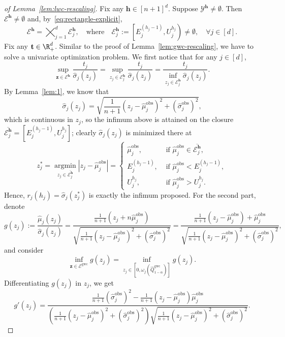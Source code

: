 \begin{proof}[of Lemma~\ref{lem:lwc-rescaling}]
Fix any $\mathbf{h} \in [n+1]^d$.
Suppose $\mathcal{Y}^{\mathbf{h}} \neq \emptyset$. Then $\mathcal{E}^{\mathbf{h}} \neq \emptyset$ and,
by~\eqref{eq:rectangle-explicit},
\[
\mathcal{E}^{\mathbf{h}} = \bigtimes_{j=1}^{d} \mathcal{E}^{\mathbf{h}}_j,
\quad\text{where}\quad
\mathcal{E}^{\mathbf{h}}_j :=\left[E^{(h_j-1)}_j, U^{h_j}_j\right) \neq \emptyset, \quad \forall j \in [d].
\]
Fix any $\mathbf t \in \R^d_+$. Similar to the proof of Lemma~\ref{lem:gwc-rescaling}, we have to solve a univariate optimization problem. We first notice that for any $j \in [d]$,
\[
\sup_{\mathbf z \in \mathcal{E}^{\mathbf{h}}} \frac{t_j}{\hat{\sigma}_{j}(z_j)}= \sup_{z_j \in \mathcal{E}^{\mathbf{h}}_j} \frac{t_j}{\hat{\sigma}_{j}(z_j)} = \frac{t_j}{\inf_{z_j \in \mathcal{E}^{\mathbf{h}}_j}\hat{\sigma}_{j}(z_j)}.
\]
By Lemma~\ref{lem:1}, we know that
\[
\hat{\sigma}_{j}(z_j) = \sqrt{\frac{1}{n+1}(z_j - \hat{\mu}^\mathrm{obs}_j)^2 + (\hat{\sigma}^\mathrm{obs}_j)^2},
\]
which is continuous in $z_j$, so the infimum above is attained on the closure $\overline{\mathcal{E}^{\mathbf{h}}_j} = \left[E^{(h_j-1)}_j, U^{h_j}_j\right]$; clearly $\hat{\sigma}_{j}(z_j)$ is minimized there at
\[
z^*_j = \operatorname*{argmin}_{z_j \in \overline{\mathcal{E}^{\mathbf{h}}_j}}|z_j-\hat{\mu}^\mathrm{obs}_j| = \begin{cases}
    \hat{\mu}^\mathrm{obs}_j, &\text{ if }\hat{\mu}^\mathrm{obs}_j \in \overline{\mathcal{E}^{\mathbf{h}}_j},\\
    E^{(h_j-1)}_j, &\text{ if } \hat{\mu}^\mathrm{obs}_j< E^{(h_j-1)}_j,\\
    U^{h_j}_j, &\text{ if }\hat{\mu}^\mathrm{obs}_j >  U^{h_j}_j.
\end{cases}
\]
Hence, $r_j(h_j) = \hat{\sigma}_{j}(z^*_j)$ is exactly the infimum proposed. 
\noindent
For the second part, denote
\[
g(z_j):=\frac{\hat{\mu}_{j}(z_j)}{\hat{\sigma}_{j}(z_j)} 
= \frac{\tfrac{1}{n+1}(z_j+n\hat{\mu}^\mathrm{obs}_j)}{\sqrt{\tfrac{1}{n+1}(z_j-\hat{\mu}^\mathrm{obs}_j)^2+(\hat{\sigma}^\mathrm{obs}_j)^2}}=\frac{\tfrac{1}{n+1}(z_j-\hat{\mu}^\mathrm{obs}_j)+\hat{\mu}^\mathrm{obs}_j}{\sqrt{\tfrac{1}{n+1}(z_j-\hat{\mu}^\mathrm{obs}_j)^2+(\hat{\sigma}^\mathrm{obs}_j)^2}},
\]
and consider
\[
\inf_{\mathbf z \in \mathcal{E}^{\mathrm{gwc}}}g(z_j) = \inf_{z_j \in [0, \omega_j(\hat{Q}^{\mathrm{gwc}}_{1-\alpha})]}g(z_j).
\]
Differentiating $g(z_j)$ in $z_j$, we get
\[
g'(z_j) = \frac{\frac{1}{n+1}(\hat{\sigma}^\mathrm{obs}_j)^2-\frac{1}{n+1}(z_j-\hat{\mu}^\mathrm{obs}_j)\hat{\mu}^\mathrm{obs}_j}{(\tfrac{1}{n+1}(z_j-\hat{\mu}^\mathrm{obs}_j)^2+(\hat{\sigma}^\mathrm{obs}_j)^2)\sqrt{\tfrac{1}{n+1}(z_j-\hat{\mu}^\mathrm{obs}_j)^2+(\hat{\sigma}^\mathrm{obs}_j)^2}}.
\]
\end{proof}
